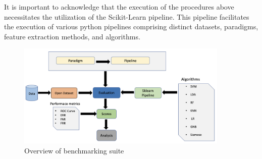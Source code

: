 It is important to acknowledge that the execution of the procedures above necessitates the utilization of the Scikit-Learn \cite{Scikit_Learn} pipeline. This pipeline facilitates the execution of various python pipelines comprising distinct datasets, paradigms, feature extraction methods, and algorithms. 

\begin{figure}
    \centering
     \includegraphics[width=0.90\textwidth]{figures/Architecture/Updated_Architecture.png}  
    
    \caption{Overview of benchmarking suite}
    \label{fig:Benchmarking suite}
    
    
\end{figure}

